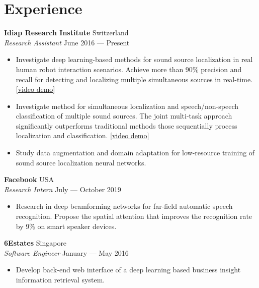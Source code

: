 \documentclass[a4paper,9pt]{extarticle} %
\begin{document}

\section{Experience}

\textbf{Idiap Research Institute}  \hfill Switzerland \\
\textit{Research Assistant} \hfill June 2016 --- Present%
\vspace{-.9\parskip}
\begin{itemize}
  \item Investigate deep learning-based methods for sound source localization in real human robot interaction scenarios.
        Achieve more than 90\% precision and recall for detecting and localizing multiple simultaneous sources in real-time.
        [\href{https://www.youtube.com/watch?v=_4EwuVlE_pU}{video demo}]
  \item Investigate method for simultaneous localization and speech/non-speech classification of multiple sound sources. 
        The joint multi-task approach significantly outperforms traditional methods those sequentially process localization and classification.
        [\href{https://www.youtube.com/watch?v=O7bQvg03RTc}{video demo}]
  \item Study data augmentation and domain adaptation for low-resource training of sound source localization neural networks.
\end{itemize}


\textbf{Facebook}  \hfill USA \\
\textit{Research Intern} \hfill July --- October 2019%
\vspace{-.9\parskip}
\begin{itemize}
  \item Research in deep beamforming networks for far-field automatic speech recognition.
        Propose the spatial attention that improves the recognition rate by 9\% on smart speaker devices.
\end{itemize}


\textbf{6Estates}  \hfill Singapore \\
\textit{Software Engineer} \hfill January --- May 2016%
\vspace{-.9\parskip}
\begin{itemize}
  \item Develop back-end web interface of a deep learning based business insight information retrieval system.
\end{itemize}
\end{document}
